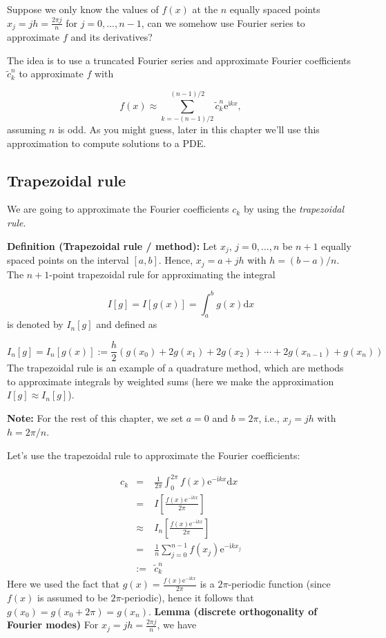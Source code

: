 \documentclass[12pt,landscape]{article}
\begin{document}
{Suppose we only know the values of $f(x)$ at the $n$ equally spaced points $x_{j} = jh = \frac{2\pi j}{n}$ for $j = 0, \ldots, n-1$, can we somehow use Fourier series to approximate $f$ and its derivatives?

The idea is to use a truncated Fourier series and approximate Fourier coefficients $\tilde{c}^n_k$ to approximate $f$ with

\[
f(x) \approx \sum_{k=-(n-1)/2}^{(n-1)/2} \tilde{c}^n_k \mathrm{e}^{\mathrm{i} k x},
\]
assuming $n$ is odd.  As you might guess, later in this chapter we'll use this approximation to compute solutions to a PDE.

\subsection{Trapezoidal rule}
We are going to approximate the Fourier coefficients $c_k$ by using the \emph{trapezoidal rule}.

\textbf{Definition (Trapezoidal rule / method):} Let $x_{j}$, $j = 0, \ldots, n$ be $n+1$ equally spaced points on the interval $[a, b]$. Hence, $x_j = a + jh$ with $h = (b-a)/n$. The $n+1$-point trapezoidal rule for approximating the integral 

\[
I[g] = I[g(x)] = \int_{a}^{b} g(x) \mathrm{d} x 
\]
is denoted by $I_n[g]$ and defined as

\[
I_n[g] = I_n[g(x)] := \frac{h}{2}\left(g(x_0) + 2g(x_1) + 2g(x_2) + \cdots + 2g(x_{n-1}) + g(x_{n})    \right)
\]
The trapezoidal rule is an example of a quadrature method, which are methods to approximate integrals by weighted sums (here we make the approximation $I[g] \approx I_n[g]$).

\textbf{Note:} For the rest of this chapter, we set $a = 0$ and $b  = 2\pi$, i.e., $x_j = jh$ with $h = 2\pi/n$.

Let's use the trapezoidal rule to approximate the Fourier coefficients: 


\begin{eqnarray*}
c_k &=& \frac{1}{2\pi}\int_{0}^{2\pi} f(x) \mathrm{e}^{-\mathrm{i}k x} \mathrm{d} x \\
    &=& I\left[\frac{f(x) \mathrm{e}^{-\mathrm{i}k x}}{2\pi}   \right] \\
    &\approx & I_{n}\left[\frac{f(x)\mathrm{e}^{-\mathrm{i}k x}}{2\pi}\right]  \\
    &=& \frac{1}{n}\sum_{j = 0}^{n-1} f(x_j)\mathrm{e}^{-\mathrm{i}kx_j} \\
    &:=& \tilde{c}^n_k
\end{eqnarray*}
Here we used the fact that $g(x) = \frac{f(x)\mathrm{e}^{-\mathrm{i}k x}}{2\pi}$ is a $2\pi$-periodic function (since $f(x)$ is assumed to be $2\pi$-periodic), hence it follows that $g(x_0) = g(x_0 + 2\pi) = g(x_n)$.
\newpage
\textbf{Lemma (discrete orthogonality of Fourier modes)} For $x_j = jh = \frac{2\pi j}{n}$, we have

}
\end{document}
